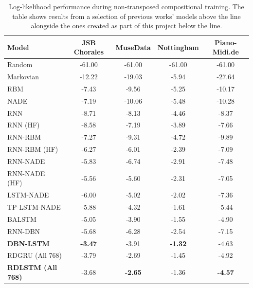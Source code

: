 \documentclass[12pt,]{article}
\begin{document}
\begin{table}[H]
\centering
\caption{Log-likelihood performance during non-transposed compositional training. The table shows results from a selection of previous works’ models above the line alongside the ones created as part of this project below the line.}
\vspace{1em}
\begin{tabular}{lcccc} 
\toprule
\textbf{Model}    & \textbf{JSB Chorales} & \textbf{MuseData} & \textbf{Nottingham} & \textbf{Piano-Midi.de}  \\ 
\midrule
Random            & -61.00                & -61.00            & -61.00              & -61.00                  \\
Markovian         & -12.22                & -19.03            & -5.94               & -27.64                  \\
RBM               & -7.43                 & -9.56             & -5.25               & -10.17                  \\
NADE              & -7.19                 & -10.06            & -5.48               & -10.28                  \\
RNN               & -8.71                 & -8.13             & -4.46               & -8.37                   \\
RNN (HF)          & -8.58                 & -7.19             & -3.89               & -7.66                   \\
RNN-RBM           & -7.27                 & -9.31             & -4.72               & -9.89                   \\
RNN-RBM (HF)      & -6.27                 & -6.01             & -2.39               & -7.09                   \\
RNN-NADE          & -5.83                 & -6.74             & -2.91               & -7.48                   \\
RNN-NADE (HF)     & -5.56                 & -5.60             & -2.31               & -7.05                   \\
LSTM-NADE         & -6.00                 & -5.02             & -2.02               & -7.36                   \\
TP-LSTM-NADE      & -5.88                 & -4.32             & -1.61               & -5.44                   \\
BALSTM            & -5.05                 & -3.90             & -1.55               & -4.90                   \\
RNN-DBN           & -5.68                 & -6.28             & -2.54               & -7.15                   \\
\textbf{DBN-LSTM} & \textbf{-3.47}        & -3.91             & \textbf{-1.32}      & -4.63                   \\ 
\midrule
RDGRU (All 768)             & -3.79                 & -2.69             & -1.45               & -4.92                   \\
\textbf{RDLSTM (All 768)}   & -3.68                 & \textbf{-2.65}    & -1.36               & \textbf{-4.57}          \\
\bottomrule
\end{tabular}
\end{table}
\end{document}
